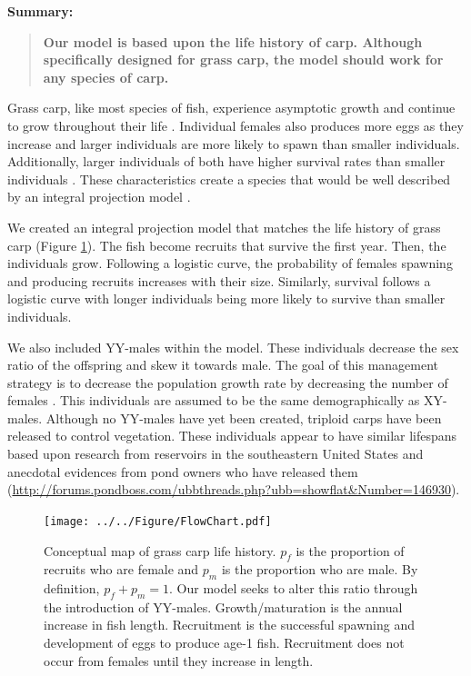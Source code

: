 \documentclass{article}[12pt]
\begin{document}
\textbf{Summary:}
\begin{verse}
\textbf{
Our model is based upon the life history of carp.
Although specifically designed for grass carp, the model should work for any species of carp. 
} 
\end{verse}

Grass carp, like most species of fish, experience asymptotic growth and continue to grow throughout their life  \citep{lagler1962john}.
Individual females also produces more eggs as they increase and larger individuals are more likely to spawn than smaller individuals.
Additionally, larger individuals of both have higher survival rates than smaller individuals \citep{shireman1983synopsis}. 
These characteristics create a species that would be well described by an integral projection model \citep{ellner2006integral, ramula2009integral, merow2014advancing}.  

We created an integral projection model that matches the life history of grass carp (Figure \ref{fig:cMap}).
The fish become recruits that survive the first year.
Then, the individuals grow. 
Following a logistic curve, the probability of females spawning and producing recruits increases with their size. 
Similarly, survival follows a logistic curve with longer individuals being more likely to survive than smaller individuals.

We also included YY-males within the model.
These individuals decrease the sex ratio of the offspring and skew it towards male.
The goal of this management strategy is to decrease the population growth rate by decreasing the number of females \citep{schill2016production}. 
This individuals are assumed to be the same demographically as XY-males.
Although no YY-males have yet been created, triploid carps have been released to control vegetation.
These individuals appear to have similar lifespans based upon research from reservoirs in the southeastern United States \citep{kirk2003longevity} and anecdotal evidences from pond owners who have released them (\url{http://forums.pondboss.com/ubbthreads.php?ubb=showflat&Number=146930}).

\begin{figure}[htbp]
	\centering
	\texttt{[image: ../../Figure/FlowChart.pdf]} 
	   \caption{Conceptual map of grass carp life history. \(p_f\) is the proportion of recruits who are female and \(p_m\) is the proportion who are male. By definition, \(p_f + p_m = 1\).  Our model seeks to alter this ratio through the introduction of YY-males. Growth/maturation is the annual increase in fish length. Recruitment is the successful spawning and development of eggs to produce age-1 fish. Recruitment does not occur from females until they increase in length.}
   \label{fig:cMap}
\end{figure}
\end{document}
